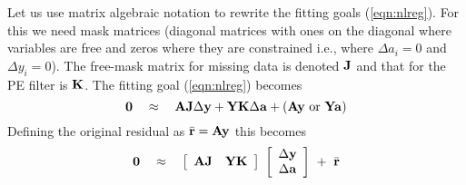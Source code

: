 \par
Let us use matrix algebraic notation to rewrite the fitting goals
(\ref{eqn:nlreg}).
For this we need mask matrices
(diagonal matrices with ones on the diagonal 
where variables are free and zeros where they are constrained
i.e., where $\Delta  a_i=0$ and $\Delta  y_i=0$).
The free-mask matrix for missing data is denoted $\bold J$
and that for the PE filter is $\bold K$.
The fitting goal (\ref{eqn:nlreg}) becomes
\begin{equation}
\bold 0
\quad \approx \quad
\bold A \bold J \Delta \bold y
+
\bold Y \bold K \Delta \bold a
+
( \bold A \bold y   {\rm \ or \  }
  \bold Y \bold a )
\label{eqn:nlreg2}
\end{equation}
Defining the original residual as
$\bar {\bold r} = \bold A\bold y$ this becomes
\begin{equation}
 \bold 0
 \quad\approx\quad
 \left[
 \begin{array}{cc}
   \bold A \bold J   &   \bold Y \bold K 
 \end{array}
 \right]
 \
 \left[
 \begin{array}{c}
   \Delta \bold y \\
   \Delta \bold a
 \end{array}
 \right]
 \ +\ \bar {\bold r}
\end{equation}

